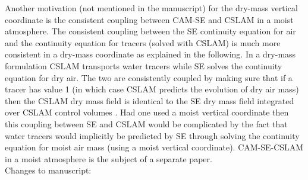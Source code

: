 \documentclass[11pt]{article}
\begin{document}
Another motivation (not mentioned in the manuscript) for the dry-mass vertical coordinate is the consistent coupling between CAM-SE and CSLAM \cite[Conservative Semi-LAgrangian Multi-tracer scheme; ][]{LNU2010JCP} in a moist atmosphere. The consistent coupling between the SE continuity equation for air and the continuity equation for tracers (solved with CSLAM) is much more consistent in a dry-mass coordinate as explained in the following. In a dry-mass formulation CSLAM transports water tracers while SE solves the continuity equation for dry air. The two are consistently coupled by making sure that if a tracer has value 1 (in which case CSLAM predicts the evolution of dry air mass) then the CSLAM dry mass field is identical to the SE dry mass field integrated over CSLAM control volumes \citep[how this is done is explained in detail in ][]{LTOUNGK2017MWR}. Had one used a moist vertical coordinate then this coupling between SE and CSLAM would be complicated by the fact that water tracers would implicitly be predicted by SE through solving the continuity equation for moist air mass (using a moist vertical coordinate). CAM-SE-CSLAM in a moist atmosphere is the subject of a separate paper.\\


Changes to manuscript:\\
\end{document}
